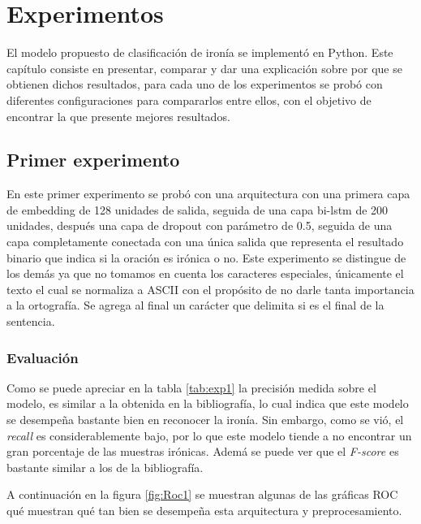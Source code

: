 \chapter{Experimentos}\label{cap.experimentos}


\par El modelo propuesto de clasificación de ironía se implementó en Python. Este capítulo consiste en presentar, comparar y dar una explicación sobre por que se obtienen dichos resultados, para cada uno de los experimentos se probó con diferentes configuraciones para compararlos entre ellos, con el objetivo de encontrar la que presente mejores resultados.

\section{Primer experimento}

\par En este primer experimento se probó con una arquitectura con una primera capa de embedding de 128 unidades de salida, seguida de una capa \gls{bi-lstm} de 200 unidades, después una capa de dropout con parámetro de 0.5, seguida de una capa completamente conectada con una única salida que representa el resultado binario que indica si la oración es irónica o no. Este experimento se distingue de los demás ya que no tomamos en cuenta los caracteres especiales, únicamente el texto el cual se normaliza a ASCII con el propósito de no darle tanta importancia a la ortografía. Se agrega al final un carácter que delimita si es el final de la sentencia.

\subsection{Evaluación}
\begin{center}
	
\end{center}

\par Como se puede apreciar en la tabla \ref{tab:exp1} la precisión medida sobre el modelo, es similar a la obtenida en la bibliografía, lo cual indica que este modelo se desempeña bastante bien en reconocer la ironía. Sin embargo, como se vió, el \textit{recall} es considerablemente bajo, por lo que este modelo tiende a no encontrar un gran porcentaje de las muestras irónicas. Ademá se puede ver que el \textit{F-score} es bastante similar a los de la bibliografía.

\par A continuación en la figura \ref{fig:Roc1} se muestran algunas de las gráficas ROC qué muestran qué tan bien se desempeña esta arquitectura y preprocesamiento.

